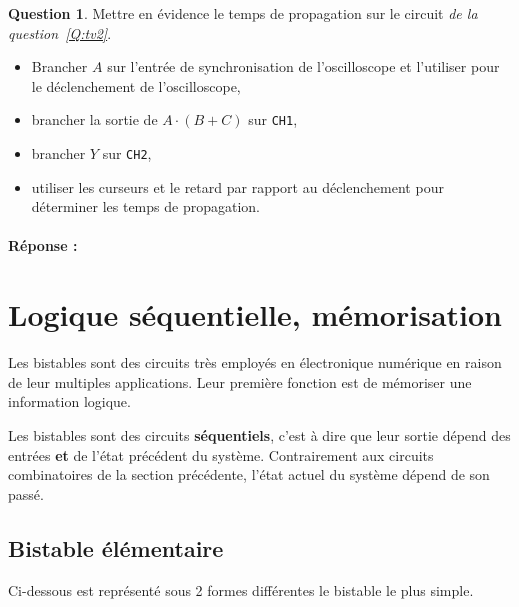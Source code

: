 \documentclass[11pt,a4paper]{article}
\theoremstyle{definition}%
\newtheorem{Q}{Question}[] %
\newcommand{\reponse}[1]{%
	\ifthenelse {\boolean{corrige}} {\paragraph{Réponse :} \color{darkblue}   #1\color{black}} {}
 }
\begin{document}
\begin{Q}
	Mettre en évidence le temps de propagation sur le circuit \textit{de la question~\ref{Q:tv2}}. 
	\begin{itemize}
	\item Brancher $A$ sur l'entrée de synchronisation de l'oscilloscope et l'utiliser pour le déclenchement de l'oscilloscope,
	\item brancher la sortie de $A\cdot(B+C)$ sur \verb!CH1!,
	\item brancher $Y$ sur \verb!CH2!,
	\item utiliser les curseurs et le retard par rapport au déclenchement pour déterminer les temps de propagation.
	\end{itemize}%
	\label{Q:1}
	\reponse{}%
\end{Q}

\newpage
\section{Logique séquentielle, mémorisation}

Les bistables sont des circuits très employés en électronique numérique en raison de leur multiples applications. Leur première fonction est de mémoriser une information logique.

Les bistables sont des circuits \textbf{séquentiels}, c'est à dire que leur sortie dépend des entrées \textbf{et} de l'état précédent du système. Contrairement aux circuits combinatoires de la section précédente, l'état actuel du système dépend de son passé.

\subsection{Bistable élémentaire}
Ci-dessous est représenté sous 2 formes différentes le bistable le plus simple.
\end{document}
